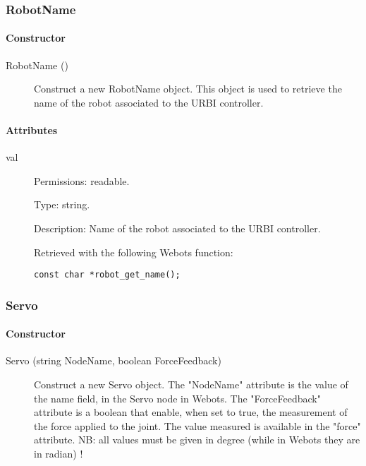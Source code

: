\subsubsection{RobotName}
\label{webots.uobjects.robotdevices.robotname}%

\paragraph{Constructor}
\label{webots.uobjects.robotdevices.robotname.constructor}%

\noindent
\begin{description}
\item[{RobotName ()}]     Construct a new RobotName object. This object is used to retrieve the name of the
          robot associated to the URBI controller.

\end{description}

\paragraph{Attributes}
\label{webots.uobjects.robotdevices.robotname.attributes}%

\noindent
\begin{description}
\item[{         val
 }]            Permissions: readable.


 Type: string.


 Description: Name of the robot associated to the URBI controller.


 Retrieved with the following Webots function:


\begin{lstlisting}[firstnumber=1,]
const char *robot_get_name();
\end{lstlisting}
\end{description}

\subsubsection{Servo}
\label{webots.uobjects.robotdevices.servo}%

\paragraph{Constructor}
\label{webots.uobjects.robotdevices.servo.constructor}%

\noindent
\begin{description}
\item[{Servo (string NodeName, boolean ForceFeedback)}] Construct a new Servo object. The "NodeName" attribute is the value
          of the name field, in the Servo node in Webots. The "ForceFeedback" attribute
          is a boolean that enable, when set to true, the measurement of the force applied
          to the joint. The value measured is available in the "force" attribute.
          NB: all values must be given in degree (while in Webots they are in radian) !

\end{description}

